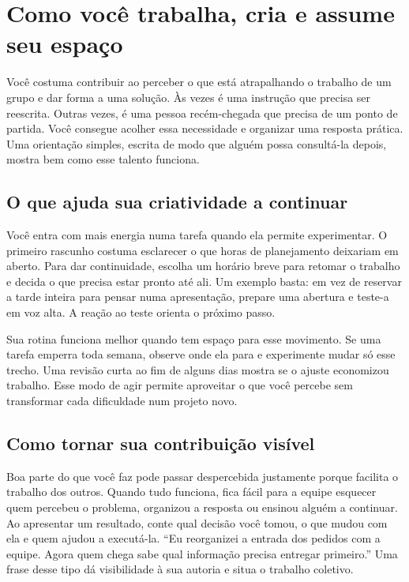\clearpage
\section*{Como você trabalha, cria e assume seu espaço}

Você costuma contribuir ao perceber o que está atrapalhando o trabalho de um grupo e dar forma a uma solução. Às vezes é uma instrução que precisa ser reescrita. Outras vezes, é uma pessoa recém-chegada que precisa de um ponto de partida. Você consegue acolher essa necessidade e organizar uma resposta prática. Uma orientação simples, escrita de modo que alguém possa consultá-la depois, mostra bem como esse talento funciona.

\subsection*{O que ajuda sua criatividade a continuar}

Você entra com mais energia numa tarefa quando ela permite experimentar. O primeiro rascunho costuma esclarecer o que horas de planejamento deixariam em aberto. Para dar continuidade, escolha um horário breve para retomar o trabalho e decida o que precisa estar pronto até ali. Um exemplo basta: em vez de reservar a tarde inteira para pensar numa apresentação, prepare uma abertura e teste-a em voz alta. A reação ao teste orienta o próximo passo.

Sua rotina funciona melhor quando tem espaço para esse movimento. Se uma tarefa emperra toda semana, observe onde ela para e experimente mudar só esse trecho. Uma revisão curta ao fim de alguns dias mostra se o ajuste economizou trabalho. Esse modo de agir permite aproveitar o que você percebe sem transformar cada dificuldade num projeto novo.

\subsection*{Como tornar sua contribuição visível}

Boa parte do que você faz pode passar despercebida justamente porque facilita o trabalho dos outros. Quando tudo funciona, fica fácil para a equipe esquecer quem percebeu o problema, organizou a resposta ou ensinou alguém a continuar. Ao apresentar um resultado, conte qual decisão você tomou, o que mudou com ela e quem ajudou a executá-la. “Eu reorganizei a entrada dos pedidos com a equipe. Agora quem chega sabe qual informação precisa entregar primeiro.” Uma frase desse tipo dá visibilidade à sua autoria e situa o trabalho coletivo.

